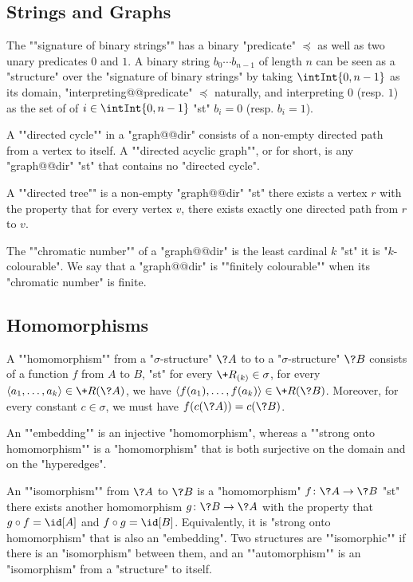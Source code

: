 \subsection{Strings and Graphs}

The ""signature of binary strings"" has a binary "predicate" $\preceq$
as well as two unary predicates $0$ and $1$.
A binary string $b_0 \cdots b_{n-1}$ of length $n$
can be seen as a "structure" over the "signature of binary strings"
by taking $\intInt{0,n-1}$ as its domain, "interpreting@@predicate"
$\preceq$ naturally, and interpreting $0$ (resp. $1$) as the set of
of $i \in \intInt{0,n-1}$ "st" $b_i = 0$ (resp. $b_i = 1$).

A \AP""directed cycle"" in a "graph@@dir" consists
of a non-empty directed path from a vertex to itself.
A ""directed acyclic graph"", or  for short,
is any "graph@@dir" "st" that contains no "directed cycle".

A ""directed tree"" is a non-empty "graph@@dir" "st" there exists 
a vertex $r$ with the property that for every vertex $v$,
there exists exactly one directed path from $r$ to $v$.

The ""chromatic number"" of a "graph@@dir" is the least cardinal $k$
"st" it is "$k$-colourable". We say that a "graph@@dir"
is \AP""finitely colourable"" when its "chromatic number" is finite.


\subsection{Homomorphisms}

A \AP""homomorphism"" from a "$\sigma$-structure" $\?A$ to
to a "$\sigma$-structure" $\?B$ consists of a function $f$ from $A$ to $B$,
"st" for every $\+R_{(k)} \in \sigma$, for every $\tup{a_1,\dotsc,a_k} \in \+R(\?A)$,
we have $\tup{f(a_1), \dotsc, f(a_k)} \in \+R(\?B)$. Moreover, for every
constant $c \in \sigma$, we must have $f(c(\?A)) = c(\?B)$.

An \AP""embedding"" is an injective "homomorphism",
whereas a \AP""strong onto homomorphism"" is a "homomorphism" that is both
surjective on the domain and on the "hyperedges". 

An \AP""isomorphism"" from $\?A$ to $\?B$ is a "homomorphism" $f\colon \?A \to \?B$
"st" there exists another homomorphism $g\colon \?B \to \?A$ with the property
that $g \circ f = \id[A]$ and $f \circ g = \id[B]$. Equivalently,
it is "strong onto homomorphism" that is also an "embedding".
Two structures are \AP""isomorphic"" if there is an "isomorphism" between them,
and an ""automorphism"" is an "isomorphism" from a "structure" to itself.

